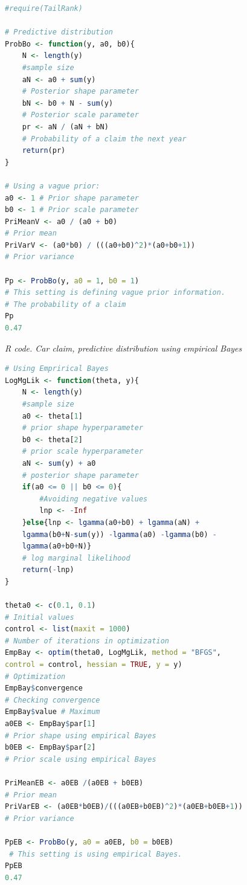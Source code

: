 \begin{enumerate}[leftmargin=*]
\begin{tcolorbox}[enhanced,width=4.67in,center upper,
	fontupper=\large\bfseries,drop shadow southwest,sharp corners]
\begin{VF}
\begin{lstlisting}[basicstyle=\footnotesize, language=R]
#require(TailRank)

# Predictive distribution
ProbBo <- function(y, a0, b0){
	N <- length(y) 
	#sample size
	aN <- a0 + sum(y) 
	# Posterior shape parameter
	bN <- b0 + N - sum(y) 
	# Posterior scale parameter
	pr <- aN / (aN + bN) 
	# Probability of a claim the next year
	return(pr)
} 

# Using a vague prior:
a0 <- 1 # Prior shape parameter
b0 <- 1 # Prior scale parameter
PriMeanV <- a0 / (a0 + b0) 
# Prior mean
PriVarV <- (a0*b0) / (((a0+b0)^2)*(a0+b0+1)) 
# Prior variance

Pp <- ProbBo(y, a0 = 1, b0 = 1)
# This setting is defining vague prior information.
# The probability of a claim
Pp 
0.47

\end{lstlisting}
\end{VF}
\end{tcolorbox}


\begin{tcolorbox}[enhanced,width=4.67in,center upper,
	fontupper=\large\bfseries,drop shadow southwest,sharp corners]
	\textit{R code. Car claim, predictive distribution using empirical Bayes}
\begin{VF}
\begin{lstlisting}[basicstyle=\footnotesize, language=R]
# Using Emprirical Bayes
LogMgLik <- function(theta, y){
	N <- length(y) 
	#sample size
	a0 <- theta[1] 
	# prior shape hyperparameter
	b0 <- theta[2] 
	# prior scale hyperparameter
	aN <- sum(y) + a0 
	# posterior shape parameter
	if(a0 <= 0 || b0 <= 0){ 
		#Avoiding negative values
		lnp <- -Inf
	}else{lnp <- lgamma(a0+b0) + lgamma(aN) + 
	lgamma(b0+N-sum(y)) -lgamma(a0) -lgamma(b0) - 
	lgamma(a0+b0+N)} 
	# log marginal likelihood
	return(-lnp)
}

theta0 <- c(0.1, 0.1) 
# Initial values
control <- list(maxit = 1000) 
# Number of iterations in optimization
EmpBay <- optim(theta0, LogMgLik, method = "BFGS", 
control = control, hessian = TRUE, y = y) 
# Optimization
EmpBay$convergence 
# Checking convergence
EmpBay$value # Maximum
a0EB <- EmpBay$par[1] 
# Prior shape using empirical Bayes
b0EB <- EmpBay$par[2] 
# Prior scale using empirical Bayes

PriMeanEB <- a0EB /(a0EB + b0EB)  
# Prior mean
PriVarEB <- (a0EB*b0EB)/(((a0EB+b0EB)^2)*(a0EB+b0EB+1)) 
# Prior variance

PpEB <- ProbBo(y, a0 = a0EB, b0 = b0EB)
 # This setting is using empirical Bayes.
PpEB
0.47

\end{lstlisting}
\end{VF}
\end{tcolorbox}



\end{enumerate}
